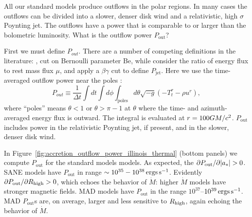 All our standard models produce outflows in the polar regions.  In many cases the outflows can be divided into a slower, denser disk wind and a relativistic, high $\sigma$ Poynting jet.  The outflows have a power that is comparable to or larger than the bolometric luminosity.  What is the outflow power $P_\mathrm{out}$?


First we must define $P_{out}$.  There are a number of competing definitions in the literature: \citet{refId0}, \citet{2014A&A...570A...7M} cut on  Bernoulli parameter Be, while \citet{10.1111/j.1365-2966.2012.22002.x} consider the ratio of energy flux to rest mass flux $\mu$, and  apply a $\beta\gamma$ cut to define $P_\mathrm{jet}$.  Here we use the time-averaged outflow power near the poles :
\begin{equation}
  P_{out} \equiv \frac{1}{\Delta t}\int dt \int d\phi \int_\mathrm{poles} d\theta \sqrt{-g}\left(-T^{r}_{t}-\rho u^{r}\right),
\end{equation}
where ``poles'' means $\theta<1$ or $\theta>\pi-1$ at $\theta$ where the time- and azimuth-averaged energy flux is outward.  The integral is evaluated at $r=100GM/c^2$. $P_\mathrm{out}$ includes power in the relativistic Poynting jet, if present, and in the slower, denser disk wind.

In Figure~\ref{fig:accretion_outflow_power_illinois_thermal}
(bottom panels) we compute $P_\mathrm{out}$ for the standard models models. As expected, the $\partial P_\mathrm{out}/\partial |a_*| > 0$. SANE models have $P_\mathrm{out}$ in range $\sim 10^{35}-10^{38} \,\mathrm{ergs\,s^{-1}}$.  Evidently $\partial P_\mathrm{out}/\partial R_\mathrm{high} > 0$, which echoes the behavior of $\dot{M}$: higher $\dot{M}$ models have stronger magnetic fields. MAD models have $P_\mathrm{out}$ in the range $10^{37}$--$10^{39} \,\mathrm{ergs\,s^{-1}}$.  MAD $P_\mathrm{out}$s are, on average, larger and less sensitive to $R_\mathrm{high}$, again echoing the behavior of $\dot{M}$.

